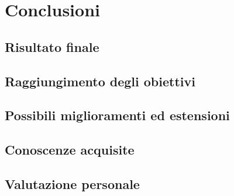 
\chapter{Conclusioni}
\label{cap:conclusioni}

\section{Risultato finale}

\section{Raggiungimento degli obiettivi}

\section{Possibili miglioramenti ed estensioni}

\section{Conoscenze acquisite}

\section{Valutazione personale}
